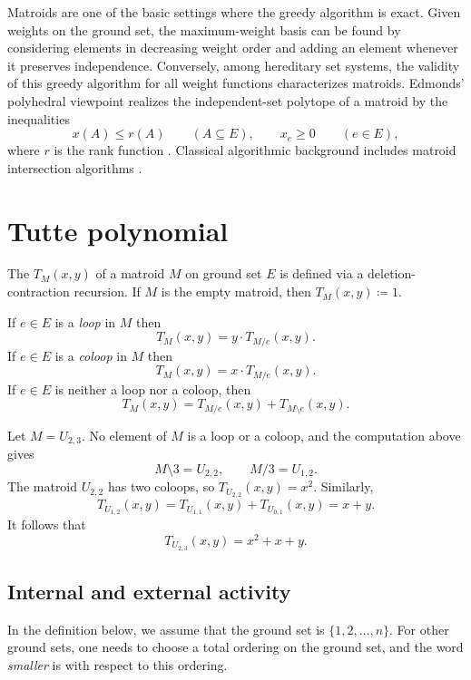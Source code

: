 Matroids are one of the basic settings where the greedy algorithm is exact.
Given weights on the ground set, the maximum-weight basis can be found by
considering elements in decreasing weight order and adding an element whenever
it preserves independence.  Conversely, among hereditary set systems, the
validity of this greedy algorithm for all weight functions characterizes
matroids.  Edmonds' polyhedral viewpoint realizes the independent-set
polytope of a matroid by the inequalities
\[
  x(A) \leq r(A) \qquad (A\subseteq E),
  \qquad x_e\geq 0 \qquad (e\in E),
\]
where $r$ is the rank function \cite{Edmonds1970}.
Classical algorithmic background includes matroid intersection algorithms
\cite{Lawler1975}.


\section[tuttePolynomial]{Tutte polynomial}

The \label{tuttePolynomialDefinition} $T_M(x,y)$ of
a matroid $M$ on ground set $E$ is defined via a deletion-contraction
recursion.
If $M$ is the empty matroid, then $T_M(x,y) \coloneqq 1$.

If $e \in E$ is a \emph{loop} in $M$ then
\[
  T_M(x,y) = y \cdot T_{M/e}(x,y).
\]
If $e \in E$ is a \emph{coloop} in $M$ then
\[
  T_M(x,y) = x \cdot T_{M/e}(x,y).
\]
If $e \in E$ is neither a loop nor a coloop, then
\[
  T_M(x,y) = T_{M/e}(x,y) + T_{M\setminus e}(x,y).
\]

\begin{example}
Let $M=U_{2,3}$.  No element of $M$ is a loop or a coloop, and the computation
above gives
\[
  M\setminus 3=U_{2,2},
  \qquad
  M/3=U_{1,2}.
\]
The matroid $U_{2,2}$ has two coloops, so $T_{U_{2,2}}(x,y)=x^2$.  Similarly,
\[
  T_{U_{1,2}}(x,y)=T_{U_{1,1}}(x,y)+T_{U_{0,1}}(x,y)=x+y.
\]
It follows that
\[
  T_{U_{2,3}}(x,y)=x^2+x+y.
\]
\end{example}


\subsection[tutteInternalExternal]{Internal and external activity}

In the definition below, we assume that the ground set is $\{1,2,\dotsc,n\}$.
For other ground sets, one needs to choose a total ordering on the ground set,
and the word \emph{smaller} is with respect to this ordering.

